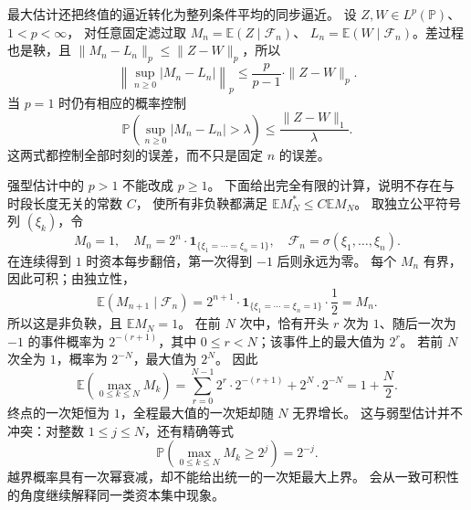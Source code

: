 最大估计还把终值的逼近转化为整列条件平均的同步逼近。
设 \(Z,W\in L^p(\mathbb P)\)、\(1<p<\infty\)，
对任意固定滤过取 \(M_n=\mathbb E(Z\mid\mathcal F_n)\)、
\(L_n=\mathbb E(W\mid\mathcal F_n)\)。差过程也是鞅，且
\(\|M_n-L_n\|_p\leq\|Z-W\|_p\)，所以
\[
 \left\|\sup_{n\geq0}|M_n-L_n|\right\|_p
 \leq\frac p{p-1}\cdot\|Z-W\|_p.
\]
当 \(p=1\) 时仍有相应的概率控制
\[
 \mathbb P\left(\sup_{n\geq0}|M_n-L_n|>\lambda\right)
 \leq\frac{\|Z-W\|_1}{\lambda}.
\]
这两式都控制全部时刻的误差，而不只是固定 \(n\) 的误差。

\ProseParagraphBreak

强型估计中的 \(p>1\) 不能改成 \(p\geq1\)。
下面给出完全有限的计算，说明不存在与时段长度无关的常数 \(C\)，
使所有非负鞅都满足 \(\mathbb E M_N^*\leq C\mathbb E M_N\)。
取独立公平符号列 \((\xi_k)\)，令
\[
 M_0=1,\quad
 M_n=2^n\cdot\mathbf1_{\{\xi_1=\cdots=\xi_n=1\}},
 \quad\mathcal F_n=\sigma(\xi_1,\ldots,\xi_n).
\]
在连续得到 \(1\) 时资本每步翻倍，第一次得到 \(-1\) 后则永远为零。
每个 \(M_n\) 有界，因此可积；由独立性，
\[
 \mathbb E(M_{n+1}\mid\mathcal F_n)
 =2^{n+1}\cdot\mathbf1_{\{\xi_1=\cdots=\xi_n=1\}}\cdot\frac12=M_n.
\]
所以这是非负鞅，且 \(\mathbb E M_N=1\)。
在前 \(N\) 次中，恰有开头 \(r\) 次为 \(1\)、随后一次为 \(-1\)
的事件概率为 \(2^{-(r+1)}\)，其中 \(0\leq r<N\)；该事件上的最大值为 \(2^r\)。
若前 \(N\) 次全为 \(1\)，概率为 \(2^{-N}\)，最大值为 \(2^N\)。
因此
\begin{equation}
 \mathbb E\left(\max_{0\leq k\leq N}M_k\right)
 =\sum_{r=0}^{N-1}2^r\cdot2^{-(r+1)}+2^N\cdot2^{-N}
 =1+\frac N2.
 \label{b1:eq:doob-endpoint-counterexample-31}
\end{equation}
终点的一次矩恒为 \(1\)，全程最大值的一次矩却随 \(N\) 无界增长。
这与弱型估计并不冲突：对整数 \(1\leq j\leq N\)，还有精确等式
\[
 \mathbb P\left(\max_{0\leq k\leq N}M_k\geq2^j\right)=2^{-j}.
\]
越界概率具有一次幂衰减，却不能给出统一的一次矩最大上界。%
会从一致可积性的角度继续解释同一类资本集中现象。
